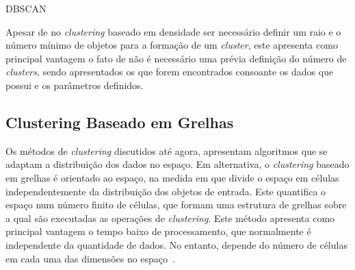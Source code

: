 \begin{algorithm}[ht]
\caption{DBSCAN}\label{dbscan}
\begin{algorithmic}[1]
	\Repeat
					\EndIf
				\EndIf
				\EndIf
			\EndFor
		\EndIf
\EndProcedure 
\end{algorithmic}
\end{algorithm}

Apesar de no \textit{clustering} baseado em densidade ser necessário definir um raio e o número mínimo de objetos para a formação de um \textit{cluster}, este apresenta como principal vantagem o fato de não é necessário uma prévia definição do número de \textit{clusters}, sendo apresentados os que forem encontrados consoante os dados que possui e os parâmetros definidos. 


\subsection{Clustering Baseado em Grelhas} %

Os métodos de \textit{clustering} discutidos até agora, apresentam algoritmos que se adaptam a distribuição dos dados no espaço. Em alternativa, o \textit{clustering} baseado em grelhas é orientado ao espaço, na medida em que divide o espaço em células independentemente da distribuição dos objetos de entrada. Este quantifica o espaço num número finito de células, que formam uma estrutura de grelhas sobre a qual são executadas as operações de \textit{clustering}. Este método apresenta como principal vantagem o tempo baixo de processamento, que normalmente é independente da quantidade de dados. No entanto, depende do número de células em cada uma das dimensões no espaço~\cite{Han2006}.

